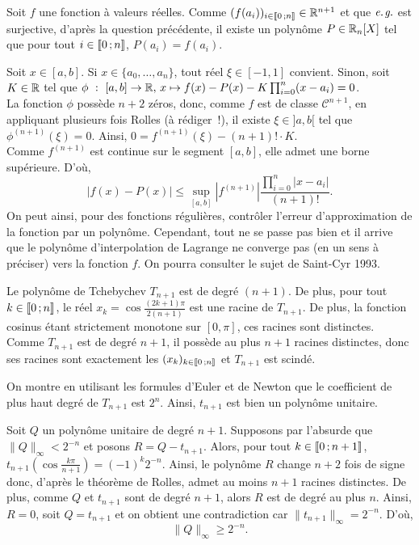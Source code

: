 \begin{solution}
\begin{questions}
\item Soit $f$ une fonction à valeurs réelles. Comme $(f(a_i))_{i\in\llbracket 0\,; n \rrbracket} \in \mathbb{R}^{n+1}$ et que $\textit{e.\nobreak\hspace{1pt}{}g.}$ est surjective, d'après la question précédente, il existe un polynôme $P \in \mathbb{R}_n[X]$ tel que pour tout $i \in \llbracket 0\,; n \rrbracket$, $P(a_i) = f(a_i)$.

\item Soit $x \in [a,b]$. Si $x \in \{a_0,\ldots,a_n\}$, tout réel $\xi \in [-1, 1]$ convient. Sinon, soit $K \in \mathbb{R}$ tel que $\phi~:~[a,b] \to \mathbb{R},\, x \mapsto f(x) - P(x) - K \prod_{i=0}^n (x - a_i) = 0$.\\
La fonction $\phi$ possède $n+2$ zéros, donc, comme $f$ est de classe $\mathscr{C}^{n+1}$, en appliquant plusieurs fois Rolles (à rédiger~!), il existe $\xi \in ]a,b[$ tel que $\phi^{(n+1)}(\xi) = 0$. Ainsi, $0 = f^{(n+1)}(\xi) - (n+1)! \cdot K$.\\
Comme $f^{(n+1)}$ est continue sur le segment $[a,b]$, elle admet une borne supérieure. D'où,
\[
|f(x) - P(x)| \leq \sup_{[a,b]} |f^{(n+1)}| \frac{\prod_{i=0}^n |x-a_i|}{(n+1)!}.
\]
{
On peut ainsi, pour des fonctions régulières, contrôler l'erreur d'approximation de la fonction par un polynôme. Cependant, tout ne se passe pas bien et il arrive que le polynôme d'interpolation de Lagrange { ne converge pas} (en un sens à préciser) vers la fonction $f$. On pourra consulter le sujet de Saint-Cyr 1993.
}

\item Le polynôme de Tchebychev $T_{n+1}$ est de degré $(n+1)$. De plus, pour tout $k \in \llbracket 0\,; n \rrbracket$, le réel $x_k = \cos \frac{(2k+1)\pi}{2(n+1)}$ est une racine de $T_{n+1}$. De plus, la fonction cosinus étant strictement monotone sur $[0,\pi]$, ces racines sont distinctes. Comme $T_{n+1}$ est de degré $n+1$, il possède au plus $n+1$ racines distinctes, donc ses racines sont exactement les $(x_k)_{k\in\llbracket 0\,; n \rrbracket}$ et $T_{n+1}$ est scindé.

\item On montre en utilisant les formules d'Euler et de Newton que le coefficient de plus haut degré de $T_{n+1}$ est $2^n$. Ainsi, $t_{n+1}$ est bien un polynôme unitaire.

\item Soit $Q$ un polynôme unitaire de degré $n+1$. Supposons par l'absurde que $\|Q\|_\infty < 2^{-n}$ et posons $R = Q - t_{n+1}$. Alors, pour tout $k \in \llbracket 0\,; n+1 \rrbracket$, $t_{n+1}(\cos \frac{k\pi}{n+1}) = (-1)^k 2^{-n}$. Ainsi, le polynôme $R$ change $n+2$ fois de signe donc, d'après le théorème de Rolles, admet au moins $n+1$ racines distinctes. De plus, comme $Q$ et $t_{n+1}$ sont de degré $n+1$, alors $R$ est de degré au plus $n$. Ainsi, $R = 0$, soit $Q = t_{n+1}$ et on obtient une contradiction car $\|t_{n+1}\|_\infty = 2^{-n}$. D'où,
{
\[\|Q\|_\infty \geq 2^{-n}.\]
}


\end{questions}
\end{solution}

